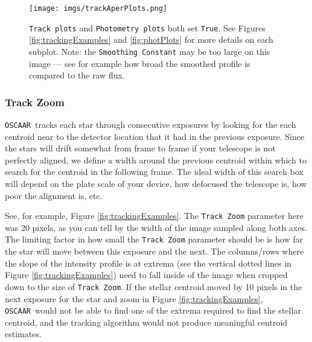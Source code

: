 \documentclass[a4paper]{article}
\newcommand{\code}[1]{\texttt{#1}}
\newcommand{\oscaar}{\code{OSCAAR}~}
\begin{document}
\begin{figure}[H]
\begin{center}
\texttt{[image: imgs/trackAperPlots.png]}
\caption{\code{Track plots} and \code{Photometry plots} both set \code{True}. See Figures \ref{fig:trackingExamples} and \ref{fig:photPlots} for more details on each subplot. Note: the \code{Smoothing Constant} may be too large on this image --- see for example how broad the smoothed profile is compared to the raw flux. }
\label{fig:trackAndPhotPlot}
\end{center}	
\end{figure}

\subsubsection{Track Zoom}
\oscaar tracks each star through consecutive exposures by looking for the each centroid near to the detector location that it had in the previous exposure. Since the stars will drift somewhat from frame to frame if your telescope is not perfectly aligned, we define a width around the previous centroid within which to search for the centroid in the following frame. The ideal width of this search box will depend on the plate scale of your device, how defocused the telescope is, how poor the alignment is, etc. 

See, for example, Figure \ref{fig:trackingExamples}. The \code{Track Zoom} parameter here was 20 pixels, as you can tell by the width of the image sampled along both axes. The limiting factor in how small the \code{Track Zoom} parameter should be is how far the star will move between this exposure and the next. The columns/rows where the slope of the intensity profile is at extrema (see the vertical dotted lines in Figure \ref{fig:trackingExamples}) need to fall inside of the image when cropped down to the size of \code{Track Zoom}. If the stellar centroid moved by 10 pixels in the next exposure for the star and zoom in Figure \ref{fig:trackingExamples}, \oscaar would not be able to find one of the extrema required to find the stellar centroid, and the tracking algorithm would not produce meaningful centroid estimates.
\end{document}
